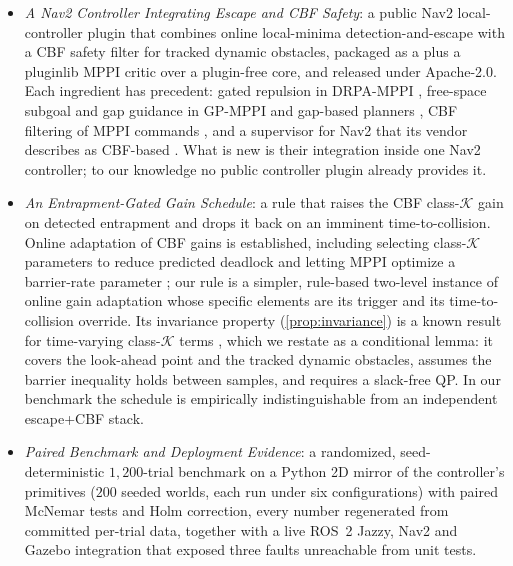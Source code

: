 \begin{itemize}
    \item \emph{A Nav2 Controller Integrating Escape and CBF Safety}: a public Nav2 local-controller plugin that combines online local-minima detection-and-escape with a CBF safety filter for tracked dynamic obstacles, packaged as a  plus a pluginlib MPPI critic over a plugin-free core, and released under Apache-2.0. Each ingredient has precedent: gated repulsion in DRPA-MPPI \citep{drpa_mppi}, free-space subgoal and gap guidance in GP-MPPI \citep{gp_mppi} and gap-based planners \citep{potential_gap,safer_gap}, CBF filtering of MPPI commands \citep{scbf_mppi}, and a supervisor for Nav2 that its vendor describes as CBF-based \citep{nav2_3laws,threelaws_pr}. What is new is their integration inside one Nav2 controller; to our knowledge no public controller plugin already provides it.
    \item \emph{An Entrapment-Gated Gain Schedule}: a rule that raises the CBF class-$\mathcal{K}$ gain on detected entrapment and drops it back on an imminent time-to-collision. Online adaptation of CBF gains is established, including selecting class-$\mathcal{K}$ parameters to reduce predicted deadlock \citep{kim_adaptive_cbf} and letting MPPI optimize a barrier-rate parameter \citep{br_mppi}; our rule is a simpler, rule-based two-level instance of online gain adaptation whose specific elements are its trigger and its time-to-collision override. Its invariance property (\cref{prop:invariance}) is a known result for time-varying class-$\mathcal{K}$ terms \citep{ada_cbf,rt_cbf}, which we restate as a conditional lemma: it covers the look-ahead point and the tracked dynamic obstacles, assumes the barrier inequality holds between samples, and requires a slack-free QP. In our benchmark the schedule is empirically indistinguishable from an independent escape+CBF stack.
    \item \emph{Paired Benchmark and Deployment Evidence}: a randomized, seed-deterministic $1{,}200$-trial benchmark on a Python 2D mirror of the controller's primitives ($200$ seeded worlds, each run under six configurations) with paired McNemar tests and Holm correction, every number regenerated from committed per-trial data, together with a live ROS~2 Jazzy, Nav2 and Gazebo integration that exposed three faults unreachable from unit tests.
\end{itemize}

